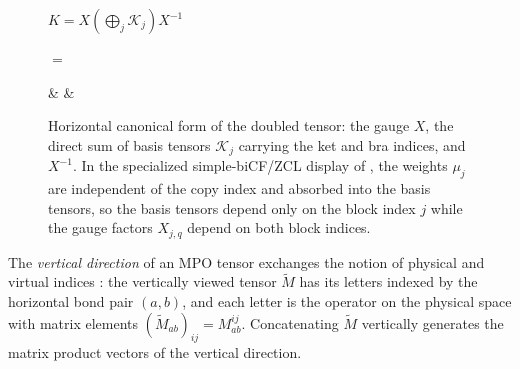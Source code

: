 \begin{figure}[ht]
    \centering
    $K=X\left(\bigoplus_j\mathcal K_j\right)X^{-1}$
    \begin{center}
        \tenkzkernel
        \begin{tenkz}[rows={wire}, cols=1, west=open, east=open]
        \end{tenkz}
        $ = $
        \begin{tenkz}[rows={wire}, cols=3, west=open, east=open]
             &  &
        \end{tenkz}
    \end{center}
    \caption{Horizontal canonical form of the doubled tensor: the gauge $X$,
        the direct sum of basis tensors $\mathcal K_j$ carrying the ket and bra
        indices, and $X^{-1}$. In the specialized simple-biCF/ZCL display of
        \cite[Appendix~C.2, lines~1660--1665]{Cirac2016MPDO_arXiv}, the weights
        $\mu_j$ are independent of the copy index and absorbed into the basis
        tensors, so the basis tensors depend only on the block index $j$ while
        the gauge factors $X_{j,q}$ depend on both block indices.}
    \label{fig:mpdo_horizontal_canonical_form}
\end{figure}

\begin{definition}%
    \label{def:vertical_tensor_mpdo}
    \leanok
    The \emph{vertical direction} of an MPO tensor exchanges the notion of
    physical and virtual indices \cite[line~943]{Cirac2016MPDO_arXiv}: the
    vertically viewed tensor $\widetilde M$ has its letters indexed by the
    horizontal bond pair $(a,b)$, and each letter is the operator on the
    physical space with matrix elements
    $(\widetilde M_{ab})_{ij}=M^{ij}_{ab}$.
    Concatenating $\widetilde M$ vertically generates the matrix product
    vectors of the vertical direction.
\end{definition}

